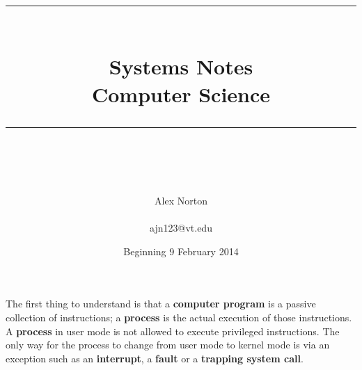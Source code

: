 \documentclass[15pt,idxtotoc,hyperref,openany]{labbook} %
\newcommand{\HRule}{\rule{\linewidth}{0.5mm}} %
\begin{document}

\frontmatter %
\title{
\begin{center}
\HRule \\[0.4cm]
{\Huge \bfseries Systems Notes \\[0.5cm] \Large Computer Science}\\[0.4cm] %
\HRule \\[1.5cm]
\end{center}
}
\author{\Huge Alex Norton\\ \\ \LARGE ajn123@vt.edu \\[2cm]} %
\date{Beginning 9 February 2014} %
\maketitle

\tableofcontents

\mainmatter %











The first thing to understand is that a {\bf computer program} is a passive collection of instructions; a {\bf process} is the actual execution of those instructions.\\

A {\bf process} in user mode is not allowed to execute privileged instructions.  The only way for the process to change from user mode to kernel mode is via an exception such as an {\bf interrupt}, a {\bf fault} or a {\bf trapping system call}.
\end{document}
